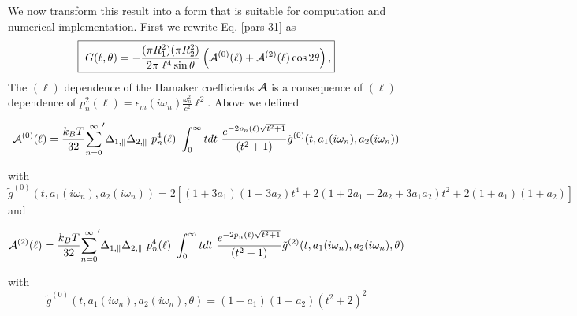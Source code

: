 \documentclass[onecolumn,letterpaper,amsmath,amssymb,floatfix,aps,superscriptaddress]{revtex4}
\begin{document}
We now transform this result into a form that is suitable for computation and numerical implementation. First we rewrite Eq. \ref{pars-31} as
\begin{equation}
  \fbox{
    $\displaystyle{
G(\ell,\theta) = - \frac{ (\pi R_1^{2})(\pi R_2^{2}) }{2 \pi~\ell^{4} \sin{\theta}} \left( {\cal A}^{(0)}(\ell) + {\cal A}^{(2)}(\ell) \cos 2\theta \right) ,}$}
\label{pars-31a}
\end{equation}
The $(\ell)$ dependence of the Hamaker coefficients $\cal A$ is a consequence of $(\ell)$ dependence of $p_n^{2}(\ell) =  \epsilon_m(i \omega_n) \frac{\omega_n^{2}}{c^{2}} \ell^{2}$. Above we defined
\begin{widetext}
\begin{equation}
{\cal A}^{(0)}(\ell) = \frac{k_BT}{32}  {\sum_{n=0}^{\infty}}' \Delta_{1,\parallel} \Delta_{2,\parallel} ~p_n^{4}(\ell) ~\int_0^{\infty} t dt ~\frac{e^{- 2 p_n(\ell) \sqrt{t^{2} + 1}}}{(t^{2} + 1)} \tilde g^{(0)}(t, a_1(i \omega_n), a_2(i \omega_n))
\label{eq:a0}
\end{equation}
\end{widetext}
with
\begin{equation}
\tilde g^{(0)}(t, a_1(i \omega_n), a_2(i \omega_n)) = 2 \left[ (1+3a_1)(1+3a_2) t^{4} + 2 (1+2a_1+2a_2+3a_1a_2) t^{2}  + 2(1+a_1)(1+a_2)\right]
\end{equation}
and
\begin{widetext}
\begin{equation}
{\cal A}^{(2)}(\ell) = \frac{k_BT}{32}  {\sum_{n=0}^{\infty}}' \Delta_{1,\parallel} \Delta_{2,\parallel} ~p_n^{4}(\ell) ~\int_0^{\infty} t dt ~\frac{e^{- 2 p_n(\ell) \sqrt{t^{2} + 1}}}{(t^{2} + 1)} \tilde g^{(2)}(t, a_1(i \omega_n), a_2(i \omega_n), \theta)
\end{equation}
\end{widetext}
with
\begin{equation}<C-LeftRelease>
\tilde g^{(0)}(t, a_1(i \omega_n), a_2(i \omega_n), \theta) = (1-a_1)(1-a_2)(t^{2} + 2)^2
\label{befgqw}
\end{equation}
\end{document}
